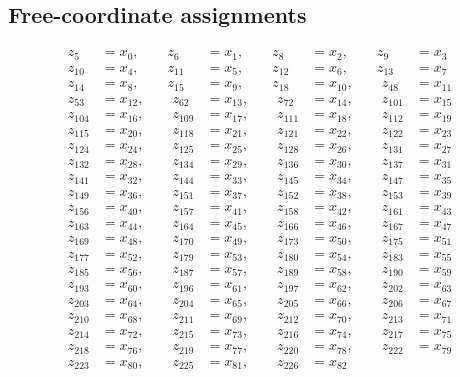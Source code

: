 \documentclass[11pt]{article}
\theoremstyle{remark}
\begin{document}
\subsection*{Free-coordinate assignments}
\begin{align*}
z_{5}&=x_{0},\qquad z_{6}&=x_{1},\qquad z_{8}&=x_{2},\qquad z_{9}&=x_{3}\\
z_{10}&=x_{4},\qquad z_{11}&=x_{5},\qquad z_{12}&=x_{6},\qquad z_{13}&=x_{7}\\
z_{14}&=x_{8},\qquad z_{15}&=x_{9},\qquad z_{18}&=x_{10},\qquad z_{48}&=x_{11}\\
z_{53}&=x_{12},\qquad z_{62}&=x_{13},\qquad z_{72}&=x_{14},\qquad z_{101}&=x_{15}\\
z_{104}&=x_{16},\qquad z_{109}&=x_{17},\qquad z_{111}&=x_{18},\qquad z_{112}&=x_{19}\\
z_{115}&=x_{20},\qquad z_{118}&=x_{21},\qquad z_{121}&=x_{22},\qquad z_{122}&=x_{23}\\
z_{124}&=x_{24},\qquad z_{125}&=x_{25},\qquad z_{128}&=x_{26},\qquad z_{131}&=x_{27}\\
z_{132}&=x_{28},\qquad z_{134}&=x_{29},\qquad z_{136}&=x_{30},\qquad z_{137}&=x_{31}\\
z_{141}&=x_{32},\qquad z_{144}&=x_{33},\qquad z_{145}&=x_{34},\qquad z_{147}&=x_{35}\\
z_{149}&=x_{36},\qquad z_{151}&=x_{37},\qquad z_{152}&=x_{38},\qquad z_{153}&=x_{39}\\
z_{156}&=x_{40},\qquad z_{157}&=x_{41},\qquad z_{158}&=x_{42},\qquad z_{161}&=x_{43}\\
z_{163}&=x_{44},\qquad z_{164}&=x_{45},\qquad z_{166}&=x_{46},\qquad z_{167}&=x_{47}\\
z_{169}&=x_{48},\qquad z_{170}&=x_{49},\qquad z_{173}&=x_{50},\qquad z_{175}&=x_{51}\\
z_{177}&=x_{52},\qquad z_{179}&=x_{53},\qquad z_{180}&=x_{54},\qquad z_{183}&=x_{55}\\
z_{185}&=x_{56},\qquad z_{187}&=x_{57},\qquad z_{189}&=x_{58},\qquad z_{190}&=x_{59}\\
z_{193}&=x_{60},\qquad z_{196}&=x_{61},\qquad z_{197}&=x_{62},\qquad z_{202}&=x_{63}\\
z_{203}&=x_{64},\qquad z_{204}&=x_{65},\qquad z_{205}&=x_{66},\qquad z_{206}&=x_{67}\\
z_{210}&=x_{68},\qquad z_{211}&=x_{69},\qquad z_{212}&=x_{70},\qquad z_{213}&=x_{71}\\
z_{214}&=x_{72},\qquad z_{215}&=x_{73},\qquad z_{216}&=x_{74},\qquad z_{217}&=x_{75}\\
z_{218}&=x_{76},\qquad z_{219}&=x_{77},\qquad z_{220}&=x_{78},\qquad z_{222}&=x_{79}\\
z_{223}&=x_{80},\qquad z_{225}&=x_{81},\qquad z_{226}&=x_{82}
\end{align*}
\end{document}
